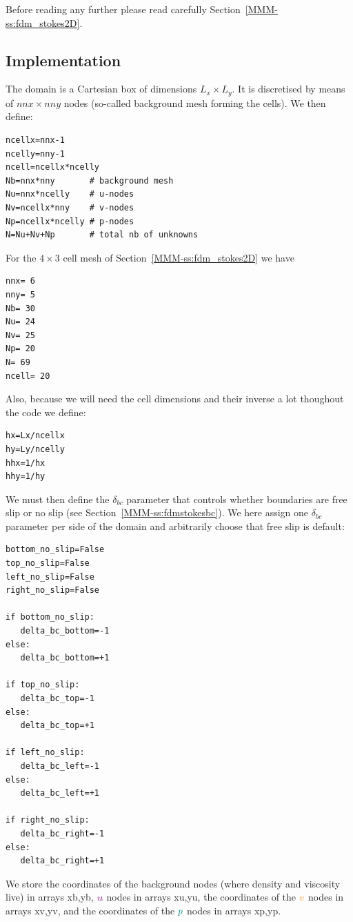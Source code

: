 Before reading any further please read carefully Section~\ref{MMM-ss:fdm_stokes2D}. 


\subsection*{Implementation}

The domain is a Cartesian box of dimensions $L_x \times L_y$. 
It is discretised by means of $nnx \times nny$ nodes (so-called
background mesh forming the cells).
We then define:
\begin{lstlisting}
ncellx=nnx-1
ncelly=nny-1
ncell=ncellx*ncelly
Nb=nnx*nny       # background mesh
Nu=nnx*ncelly    # u-nodes
Nv=ncellx*nny    # v-nodes  
Np=ncellx*ncelly # p-nodes
N=Nu+Nv+Np       # total nb of unknowns
\end{lstlisting}
For the $4\times 3$ cell mesh of Section~\ref{MMM-ss:fdm_stokes2D} we have

\begin{verbatim}
nnx= 6
nny= 5
Nb= 30
Nu= 24
Nv= 25
Np= 20
N= 69
ncell= 20
\end{verbatim}

Also, because we will need the cell dimensions and their inverse a lot 
thoughout the code we define:
\begin{lstlisting}
hx=Lx/ncellx
hy=Ly/ncelly
hhx=1/hx
hhy=1/hy
\end{lstlisting}

We must then define the $\delta_{bc}$ parameter that 
controls whether boundaries are free slip or no slip
(see Section~\ref{MMM-ss:fdmstokesbc}).
We here assign one $\delta_{bc}$ parameter per side 
of the domain and arbitrarily choose that free slip is 
default:

\begin{lstlisting}
bottom_no_slip=False
top_no_slip=False
left_no_slip=False
right_no_slip=False

if bottom_no_slip:
   delta_bc_bottom=-1
else:
   delta_bc_bottom=+1

if top_no_slip:
   delta_bc_top=-1
else:
   delta_bc_top=+1

if left_no_slip:
   delta_bc_left=-1
else:
   delta_bc_left=+1

if right_no_slip:
   delta_bc_right=-1
else:
   delta_bc_right=+1
\end{lstlisting}

We store the coordinates of the background nodes (where 
density and viscosity live) in arrays {\python xb,yb}, 
${\color{violet} u}$ nodes in arrays {\python xu,yu},
the coordinates of the ${\color{orange}v}$ nodes in arrays {\python xv,yv},
and the coordinates of the ${\color{teal}p}$ nodes in arrays {\python xp,yp}.


